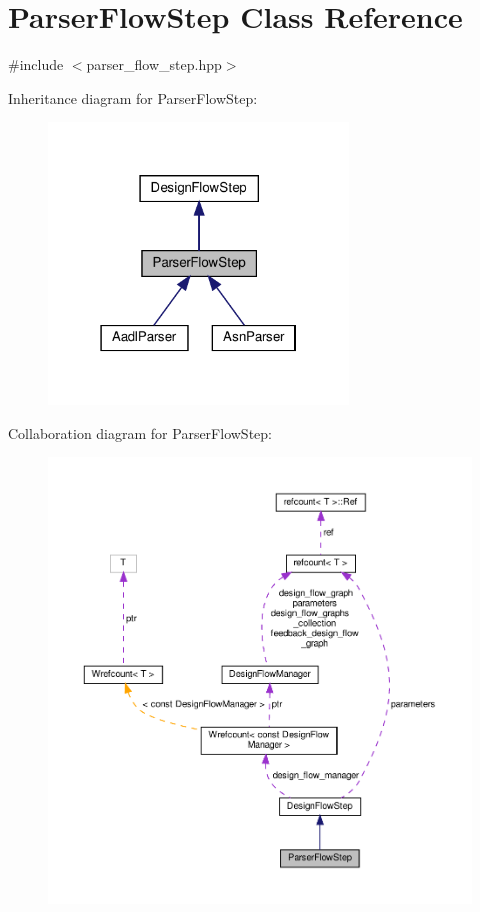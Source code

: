 \hypertarget{classParserFlowStep}{}\section{Parser\+Flow\+Step Class Reference}
\label{classParserFlowStep}


{\ttfamily \#include $<$parser\+\_\+flow\+\_\+step.\+hpp$>$}



Inheritance diagram for Parser\+Flow\+Step\+:
\nopagebreak
\begin{figure}[H]
\begin{center}
\leavevmode
\includegraphics[width=226pt]{d2/dca/classParserFlowStep__inherit__graph}
\end{center}
\end{figure}


Collaboration diagram for Parser\+Flow\+Step\+:
\nopagebreak
\begin{figure}[H]
\begin{center}
\leavevmode
\includegraphics[width=350pt]{dc/db8/classParserFlowStep__coll__graph}
\end{center}
\end{figure}
